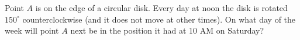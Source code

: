 Point $A$ is on the edge of a circular disk. Every day at noon the disk is rotated $150^\circ$ counterclockwise (and it does not move at other times). On what day of the week will point $A$ next be in the position it had at 10 AM on Saturday?

